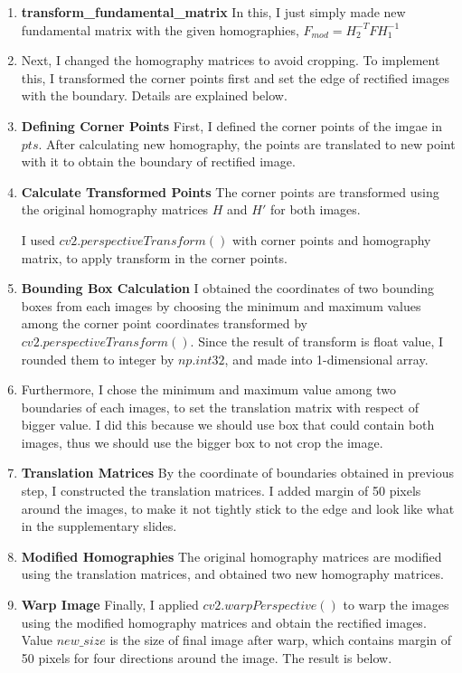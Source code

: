 \begin{enumerate}
    \item \textbf{transform\_fundamental\_matrix} In this, I just simply made new fundamental matrix with the given homographies, $F_{mod}=H_2^{-T}FH_1^{-1}$
    \item Next, I changed the homography matrices to avoid cropping. To implement this, I transformed the corner points first and set the edge of rectified images with the boundary. Details are explained below.
    \item \textbf{Defining Corner Points} First, I defined the corner points of the imgae in $pts$. After calculating new homography, the points are translated to new point with it to obtain the boundary of rectified image.
    
    \item \textbf{Calculate Transformed Points} The corner points are transformed using the original homography matrices $H$ and $H'$ for both images. 
    
    I used $cv2.perspectiveTransform()$ with corner points and homography matrix, to apply transform in the corner points.

    \item \textbf{Bounding Box Calculation} I obtained the coordinates of two bounding boxes from each images by choosing the minimum and maximum values among the corner point coordinates transformed by $cv2.perspectiveTransform()$. Since the result of transform is float value, I rounded them to integer by $np.int32$, and made into 1-dimensional array.
    \item Furthermore, I chose the minimum and maximum value among two boundaries of each images, to set the translation matrix with respect of bigger value. I did this because we should use box that could contain both images, thus we should use the bigger box to not crop the image.
    \item \textbf{Translation Matrices} By the coordinate of boundaries obtained in previous step, I constructed the translation matrices. I added margin of 50 pixels around the images, to make it not tightly stick to the edge and look like what in the supplementary slides.
    \item \textbf{Modified Homographies} The original homography matrices are modified using the translation matrices, and obtained two new homography matrices.
    \item \textbf{Warp Image} Finally, I applied $cv2.warpPerspective()$ to warp the images using the modified homography matrices and obtain the rectified images. Value $new\_size$ is the size of final image after warp, which contains margin of 50 pixels for four directions around the image. The result is below.
    
\end{enumerate}
